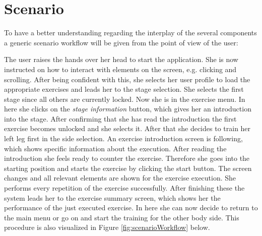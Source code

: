 \section{Scenario}\label{4_7_requirements_scenario}
To have a better understanding regarding the interplay of the several components a generic scenario workflow will be given from the point of view of the user:

The user raises the hands over her head to start the application. She is now instructed on how to interact with elements on  the screen, e.g. clicking and scrolling. After being confident with this, she selects her user profile to load the appropriate exercises and leads her to the stage selection. She selects the first stage since all others are currently locked. Now she is in the exercise menu. In here she clicks on the \textit{stage information} button, which gives her an introduction into the stage. After confirming that she has read the introduction the first exercise becomes unlocked and she selects it. After that she decides to train her left leg first in the side selection. An exercise introduction screen is following, which shows specific information about the execution. After reading the introduction she feels ready to counter the exercise. Therefore she goes into the starting position and starts the exercise by clicking the start button. The screen changes and all relevant elements are shown for the exercise execution. She performs every repetition of the exercise successfully. After finishing these the system leads her to the exercise summary screen, which shows her the performance of the just executed exercise. In here she can now decide to return to the main menu or go on and start the training for the other body side. This procedure is also visualized in Figure \ref{fig:scenarioWorkflow} below.
